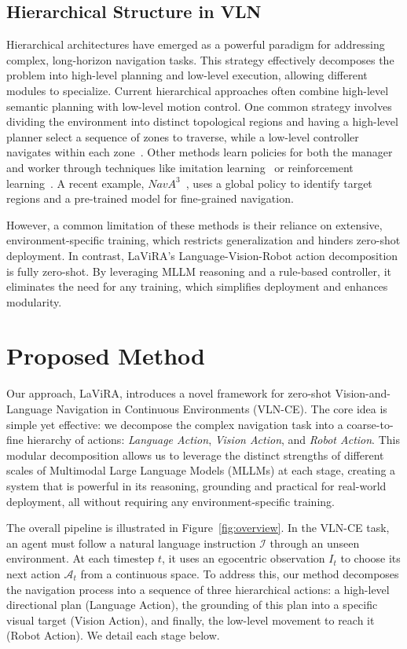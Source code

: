 \documentclass[letterpaper, 10 pt, conference]{ieeeconf}
\begin{document}
\subsection{Hierarchical Structure in VLN}
\label{related-work-hierachical}
Hierarchical architectures have emerged as a powerful paradigm for addressing complex, long-horizon navigation tasks. This strategy effectively decomposes the problem into high-level planning and low-level execution, allowing different modules to specialize. Current hierarchical approaches often combine high-level semantic planning with low-level motion control. One common strategy involves dividing the environment into distinct topological regions and having a high-level planner select a sequence of zones to traverse, while a low-level controller navigates within each zone~\cite{liu2023azhp, 2024HOZ}. Other methods learn policies for both the manager and worker through techniques like imitation learning~\cite{2021hcm} or reinforcement learning~\cite{2024Feudal}. A recent example, $NavA^3$~\cite{2025NavA}, uses a global policy to identify target regions and a pre-trained model for fine-grained navigation.

However, a common limitation of these methods is their reliance on extensive, environment-specific training, which restricts generalization and hinders zero-shot deployment. In contrast, LaViRA's Language-Vision-Robot action decomposition is fully zero-shot. By leveraging MLLM reasoning and a rule-based controller, it eliminates the need for any training, which simplifies deployment and enhances modularity.

\section{Proposed Method}
\label{sec:method}

Our approach, LaViRA, introduces a novel framework for zero-shot Vision-and-Language Navigation in Continuous Environments (VLN-CE). The core idea is simple yet effective: we decompose the complex navigation task into a coarse-to-fine hierarchy of actions: \textit{Language Action}, \textit{Vision Action}, and \textit{Robot Action}. This modular decomposition allows us to leverage the distinct strengths of different scales of Multimodal Large Language Models (MLLMs) at each stage, creating a system that is powerful in its reasoning, grounding and practical for real-world deployment, all without requiring any environment-specific training.

The overall pipeline is illustrated in Figure~\ref{fig:overview}. In the VLN-CE task, an agent must follow a natural language instruction $\mathcal{I}$ through an unseen environment. At each timestep $t$, it uses an egocentric observation $I_t$ to choose its next action $\mathcal{A}_t$ from a continuous space. To address this, our method decomposes the navigation process into a sequence of three hierarchical actions: a high-level directional plan (Language Action), the grounding of this plan into a specific visual target (Vision Action), and finally, the low-level movement to reach it (Robot Action). We detail each stage below.
\end{document}
